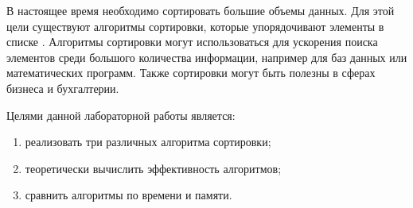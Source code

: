 \newpage
{}

В настоящее время необходимо сортировать большие объемы данных. Для этой
цели существуют алгоритмы сортировки, которые упорядочивают элементы в
списке \cite{knuth}. Алгоритмы сортировки могут использоваться для ускорения поиска элементов
среди большого количества информации, например для баз данных или математических программ.
Также сортировки могут быть полезны в сферах бизнеса и бухгалтерии.

Целями данной лабораторной работы является:

\begin{enumerate}
    \item реализовать три различных алгоритма сортировки;
    \item теоретически вычислить эффективность алгоритмов;
    \item сравнить алгоритмы по времени и памяти.
\end{enumerate}
